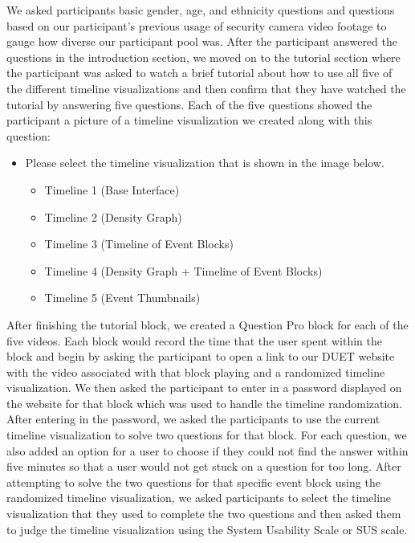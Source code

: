\documentclass[doublespace,draft,nopageskip]{VTthesis} %
\begin{document}
We asked participants basic gender, age, and ethnicity questions and questions based on our participant's previous usage of security camera video footage to gauge how diverse our participant pool was. After the participant answered the questions in the introduction section, we moved on to the tutorial section where the participant was asked to watch a brief tutorial about how to use all five of the different timeline visualizations and then confirm that they have watched the tutorial by answering five questions. Each of the five questions showed the participant a picture of a timeline visualization we created along with this question: 

\begin{itemize}
    \item Please select the timeline visualization that is shown in the image below.
    \begin{itemize}
        \item Timeline 1 (Base Interface)
        \item Timeline 2 (Density Graph)
        \item Timeline 3 (Timeline of Event Blocks)
        \item Timeline 4 (Density Graph + Timeline of Event Blocks)
        \item Timeline 5 (Event Thumbnails)
    \end{itemize}
\end{itemize}

After finishing the tutorial block, we created a Question Pro block for each of the five videos. Each block would record the time that the user spent within the block and begin by asking the participant to open a link to our DUET website with the video associated with that block playing and a randomized timeline visualization. We then asked the participant to enter in a password displayed on the website for that block which was used to handle the timeline randomization. After entering in the password, we asked the participants to use the current timeline visualization to solve two questions for that block. For each question, we also added an option for a user to choose if they could not find the answer within five minutes so that a user would not get stuck on a question for too long. After attempting to solve the two questions for that specific event block using the randomized timeline visualization, we asked participants to select the timeline visualization that they used to complete the two questions and then asked them to judge the timeline visualization using the System Usability Scale or SUS scale.
\end{document}
